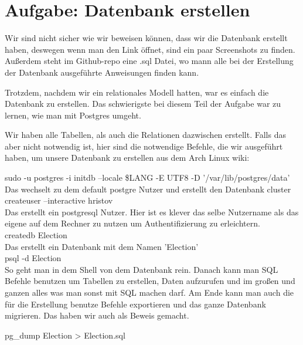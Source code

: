 \section{Aufgabe: Datenbank erstellen}
Wir sind nicht sicher wie wir beweisen können, dass wir die Datenbank erstellt haben, deswegen wenn man den Link öffnet, 
sind ein paar Screenshots zu finden. Außerdem steht im Github-repo eine .sql Datei, wo mann alle bei der Erstellung der Datenbank
ausgeführte Anweisungen finden kann. 

Trotzdem, nachdem wir ein relationales Modell hatten, war es einfach die Datenbank zu erstellen. Das schwierigste bei diesem Teil
der Aufgabe war zu lernen, wie man mit Postgres umgeht.

Wir haben alle Tabellen, als auch die Relationen dazwischen erstellt. Falls das aber nicht notwendig ist, hier sind die notwendige Befehle, die wir ausgeführt haben, um unsere Datenbank zu erstellen aus dem Arch Linux wiki:

sudo -u postgres -i
initdb --locale \$LANG -E UTF8 -D '/var/lib/postgres/data' \\

Das wechselt zu dem default postgre Nutzer und erstellt den Datenbank cluster \\

createuser --interactive hristov \\

Das erstellt ein postgresql Nutzer. Hier ist es klever das selbe Nutzername als das eigene auf dem Rechner zu nutzen um Authentifizierung zu erleichtern. \\

createdb Election \\

Das erstellt ein Datenbank mit dem Namen 'Election' \\

psql -d Election \\

So geht man in dem Shell von dem Datenbank rein. Danach kann man SQL Befehle benutzen um 
Tabellen zu erstellen, Daten aufzurufen und im großen und ganzen alles was man sonst mit SQL machen darf. Am Ende kann man auch die für die Erstellung benutze Befehle exportieren und das ganze Datenbank migrieren. Das haben wir auch als Beweis gemacht.

pg\_dump Election > Election.sql


